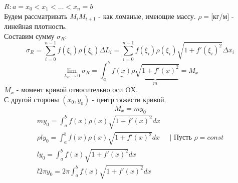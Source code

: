 \documentclass[12pt]{article}
\begin{document}
\begin{enumerate}
\begin{center}
        \end{center}
        $R: a=x_0<x_1<\dots<x_n=b$\\
        Будем рассматривать $M_iM_{i+1}$ - как ломаные, имеющие массу. $\rho =$[кг/м] - линейная плотность.\\
        Составим сумму $\sigma_R$:
        \[ \sigma_R=\sum_{i=0}^{n-1}f(\xi_i)\rho(\xi_i)\Delta L_i=\sum_{i=0}^{n-1} f(\xi_i)\rho(\xi_i)\sqrt{1+f'(\xi_i)^2}\Delta x_i \]
        \[ \lim_{\lambda_R \to 0}\sigma_R=\int_{a}^{b}\underset{r}{f(x)} \underbrace{\rho\sqrt{1+f'(x)^2}}_{m}=M_x \] $M_x$ - момент кривой относительно оси OX.\\
        С другой стороны $(x_0, y_0)$ - центр тяжести кривой.\\
        \[ M_x=my_0 \]
        \begin{gather*}
            my_0=\int_{a}^{b}f(x)\rho(x)\sqrt{1+f'(x)^2}dx\\
            \rho ly_0=\int_{a}^{b}f(x)\rho(x)\sqrt{1+f'(x)^2}dx \;\;\;\;\; \Big| \text{ Пусть } \rho = const\\
            ly_0=\int_{a}^{b}f(x)\sqrt{1+f'(x)^2}dx\\
            l2\pi y_0=2 \pi \int_{a}^{b} f(x)\sqrt{1+f'(x)^2}dx
        \end{gather*}

\end{enumerate}
\end{document}

